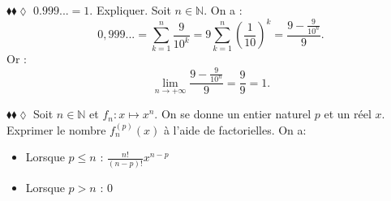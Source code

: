 \documentclass[11pt]{article}
\begin{document}
\begin{exercice}{$\blacklozenge\blacklozenge\lozenge$}{}
    $0.999...=1$. Expliquer.
    \tcblower
    Soit $n\in\mathbb{N}$. On a :
    \begin{equation*}
        0,999... = \sum\limits^{n}_{k=1}{\frac{9}{10^k}}=9\sum\limits^{n}_{k=1}{\left(\frac{1}{10}\right)^k}=\frac{9-\frac{9}{10^n}}{9}.
    \end{equation*}
    Or :
    \begin{equation*}
        \lim_{n\rightarrow+\infty}{\frac{9-\frac{9}{10^n}}{9}}=\frac{9}{9}=1.
    \end{equation*}
\end{exercice}

\begin{exercice}{$\blacklozenge\blacklozenge\lozenge$}{}
    Soit $n\in\mathbb{N}$ et $f_n:x\mapsto x^n$. On se donne un entier naturel $p$ et un réel $x$.\\
    Exprimer le nombre $f_{n}^{(p)}(x)$ à l'aide de factorielles.
    \tcblower
    On a:
    \begin{itemize}
        \item Lorsque $p\leq n$ : $\frac{n!}{(n-p)!}x^{n-p}$
        \item Lorsque $p>n$ : 0
    \end{itemize}
\end{exercice}

\pagebreak
\end{document}
